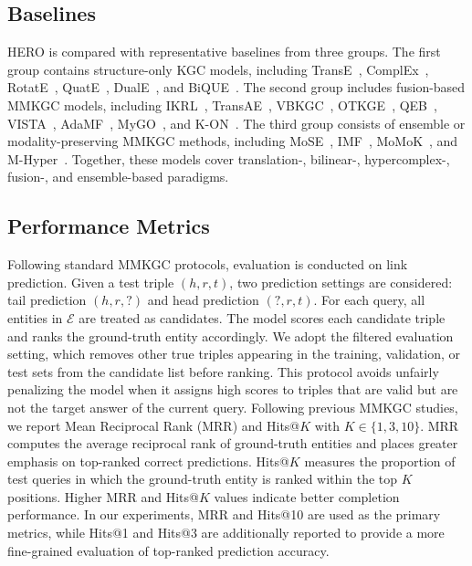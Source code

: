 \documentclass[a4paper,fleqn]{cas-sc}
\begin{document}
\subsection{Baselines}

HERO is compared with representative baselines from three groups. The first group contains structure-only KGC models, including TransE~\cite{bordes2013transe}, ComplEx~\cite{trouillon2016complex}, RotatE~\cite{sun2019rotate}, QuatE~\cite{zhang2019quate}, DualE~\cite{cao2021duale}, and BiQUE~\cite{guo2021bique}. The second group includes fusion-based MMKGC models, including IKRL~\cite{xie2017ikrl}, TransAE~\cite{wang2019transae}, VBKGC~\cite{zhang2022vbkgc}, OTKGE~\cite{cao2022otkge}, QEB~\cite{wang2023qeb}, VISTA~\cite{lee2023vista}, AdaMF~\cite{zhang2024adamfmat}, MyGO~\cite{zhang2025mygo}, and K-ON~\cite{guo2025kon}. The third group consists of ensemble or modality-preserving MMKGC methods, including MoSE~\cite{zhao2022mose}, IMF~\cite{li2023imf}, MoMoK~\cite{zhang2025momok}, and M-Hyper~\cite{liu2026mhyper}. Together, these models cover translation-, bilinear-, hypercomplex-, fusion-, and ensemble-based paradigms.

\subsection{Performance Metrics}

Following standard MMKGC protocols, evaluation is conducted on link prediction. Given a test triple $(h,r,t)$, two prediction settings are considered: tail prediction $(h,r,?)$ and head prediction $(?,r,t)$. For each query, all entities in $\mathcal{E}$ are treated as candidates. The model scores each candidate triple and ranks the ground-truth entity accordingly.
We adopt the filtered evaluation setting, which removes other true triples appearing in the training, validation, or test sets from the candidate list before ranking. This protocol avoids unfairly penalizing the model when it assigns high scores to triples that are valid but are not the target answer of the current query. Following previous MMKGC studies, we report Mean Reciprocal Rank (MRR) and Hits@$K$ with $K \in \{1,3,10\}$.
MRR computes the average reciprocal rank of ground-truth entities and places greater emphasis on top-ranked correct predictions. Hits@$K$ measures the proportion of test queries in which the ground-truth entity is ranked within the top $K$ positions. Higher MRR and Hits@$K$ values indicate better completion performance. In our experiments, MRR and Hits@10 are used as the primary metrics, while Hits@1 and Hits@3 are additionally reported to provide a more fine-grained evaluation of top-ranked prediction accuracy.
\end{document}

